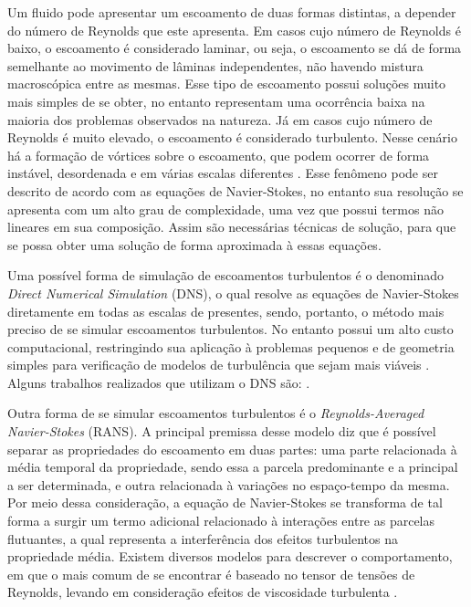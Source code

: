 Um fluido pode apresentar um escoamento de duas formas distintas, a depender do número de Reynolds que este apresenta. Em casos cujo número de Reynolds é baixo, o escoamento é considerado laminar, ou seja, o escoamento se dá de forma semelhante ao movimento de lâminas independentes, não havendo mistura macroscópica entre as mesmas. Esse tipo de escoamento possui soluções muito mais simples de se obter, no entanto representam uma ocorrência baixa na maioria dos problemas observados na natureza. Já em casos cujo número de Reynolds é muito elevado, o escoamento é considerado turbulento. Nesse cenário há a formação de vórtices sobre o escoamento, que podem ocorrer de forma instável, desordenada e em várias escalas diferentes \cite{popiolek2005analise,shaughnessy2005introduction}. Esse fenômeno pode ser descrito de acordo com as equações de Navier-Stokes, no entanto sua resolução se apresenta com um alto grau de complexidade, uma vez que possui termos não lineares em sua composição. Assim são necessárias técnicas de solução, para que se possa obter uma solução de forma aproximada à essas equações.

Uma possível forma de simulação de escoamentos turbulentos é o denominado \textit{Direct Numerical Simulation} (DNS), o qual resolve as equações de Navier-Stokes diretamente em todas as escalas de presentes, sendo, portanto, o método mais preciso de se simular escoamentos turbulentos. No entanto possui um alto custo computacional, restringindo sua aplicação à problemas pequenos e de geometria simples para verificação de modelos de turbulência que sejam mais viáveis \cite{piomelli1999large,yokokawa200216}. Alguns trabalhos realizados que utilizam o DNS são: .

Outra forma de se simular escoamentos turbulentos é o \textit{Reynolds-Averaged Navier-Stokes} (RANS). A principal premissa desse modelo diz que é possível separar as propriedades do escoamento em duas partes: uma parte relacionada à média temporal da propriedade, sendo essa a parcela predominante e a principal a ser determinada, e outra relacionada à variações no espaço-tempo da mesma. Por meio dessa consideração, a equação de Navier-Stokes se transforma de tal forma a surgir um termo adicional relacionado à interações entre as parcelas flutuantes, a qual representa a interferência dos efeitos turbulentos na propriedade média. Existem diversos modelos para descrever o comportamento, em que o mais comum de se encontrar é baseado no tensor de tensões de Reynolds, levando em consideração efeitos de viscosidade turbulenta \cite{piomelli1999large,alfonsi2009reynolds,bazilevs2010large,ling2015evaluation}.

